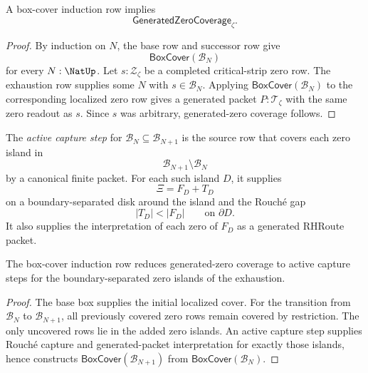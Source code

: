 \begin{theorem}
\label{thm:unified-reality-box-cover-induction-gives-generated-coverage}
A box-cover induction row implies
$$
\mathsf{GeneratedZeroCoverage}_{\zeta}.
$$
\end{theorem}

\begin{proof}
By induction on $N$, the base row and successor row give
$$
\mathsf{BoxCover}(\mathcal B_N)
$$
for every $N:\NatUp$.  Let $s:\mathcal Z_{\zeta}$ be a completed
critical-strip zero row.  The exhaustion row supplies some $N$ with
$s\in\mathcal B_N$.  Applying $\mathsf{BoxCover}(\mathcal B_N)$ to the
corresponding localized zero row gives a generated packet
$P:\mathcal T_{\zeta}$ with the same zero readout as $s$.  Since $s$ was
arbitrary, generated-zero coverage follows.
\end{proof}

\begin{definition}
\label{def:unified-reality-active-capture-step}
The \emph{active capture step} for
$\mathcal B_N\subseteq\mathcal B_{N+1}$ is the source row that covers
each zero island in
$$
\mathcal B_{N+1}\setminus\mathcal B_N
$$
by a canonical finite packet.  For each such island $D$, it supplies
$$
\Xi=F_D+T_D
$$
on a boundary-separated disk around the island and the Rouch\'e gap
$$
|T_D|<|F_D|
\qquad\text{on }\partial D.
$$
It also supplies the interpretation of each zero of $F_D$ as a generated
RHRoute packet.
\end{definition}

\begin{corollary}
\label{cor:unified-reality-active-capture-steps-coverage-content}
The box-cover induction row reduces generated-zero coverage to active
capture steps for the boundary-separated zero islands of the exhaustion.
\end{corollary}

\begin{proof}
The base box supplies the initial localized cover.  For the transition
from $\mathcal B_N$ to $\mathcal B_{N+1}$, all previously covered zero
rows remain covered by restriction.  The only uncovered rows lie in the
added zero islands.  An active capture step supplies Rouch\'e capture
and generated-packet interpretation for exactly those islands, hence
constructs $\mathsf{BoxCover}(\mathcal B_{N+1})$ from
$\mathsf{BoxCover}(\mathcal B_N)$.
\end{proof}

